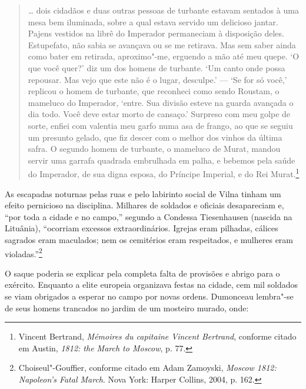 \begin{quote}
\ldots{} dois cidadãos e duas outras pessoas de turbante estavam
sentados à uma mesa bem iluminada, sobre a qual estava servido um
delicioso jantar. Pajens vestidos na librê do Imperador permaneciam à
disposição deles. Estupefato, não sabia se avançava ou se me retirava.
Mas sem saber ainda como bater em retirada, aproximo"-me, erguendo a mão
até meu quepe. `O que você quer?' diz um dos homens de turbante. `Um
canto onde possa repousar. Mas vejo que este não é o lugar, desculpe.' ---
`Se for só você,' replicou o homem de turbante, que reconheci como sendo
Roustam, o mameluco do Imperador, `entre. Sua divisão esteve na guarda
avançada o dia todo. Você deve estar morto de cansaço.' Surpreso com meu
golpe de sorte, enfiei com valentia meu garfo numa asa de frango, ao que
se seguiu um presunto gelado, que fiz descer com o melhor dos vinhos da
última safra. O segundo homem de turbante, o mameluco de Murat, mandou
servir uma garrafa quadrada embrulhada em palha, e bebemos pela saúde do
Imperador, de sua digna esposa, do Príncipe Imperial, e do Rei
Murat.\footnote{Vincent Bertrand, \textit{Mémoires du capitaine Vincent Bertrand}, conforme citado em Austin, \textit{1812: the March to Moscow}, p. 77.} 
\end{quote}

As escapadas noturnas pelas ruas e pelo labirinto social de Vilna tinham
um efeito pernicioso na disciplina. Milhares de soldados e oficiais
desapareciam e, ``por toda a cidade e no campo,'' segundo a Condessa
Tiesenhausen (nascida na Lituânia), ``ocorriam excessos extraordinários.
Igrejas eram pilhadas, cálices sagrados eram maculados; nem os
cemitérios eram respeitados, e mulheres eram violadas.''\footnote{Choiseul"-Gouffier, conforme citado em Adam Zamoyski, \textit{Moscow 1812: Napoleon's Fatal March}. Nova York: Harper Collins, 2004, p. 162.}

O saque poderia se explicar pela completa falta de provisões e abrigo
para o exército. Enquanto a elite europeia organizava festas na cidade,
cem mil soldados se viam obrigados a esperar no campo por novas ordens.
Dumonceau lembra"-se de seus homens trancados no jardim de um mosteiro
murado, onde:

